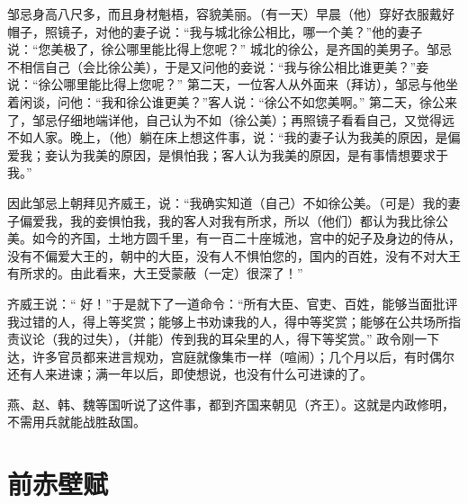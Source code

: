 \documentclass[12pt,UTF-8,openany,a4]{ctexbook}
\begin{document}
\begin{large}\yiwen
    
    邹忌身高八尺多，而且身材魁梧，容貌美丽。（有一天）早晨（他）穿好衣服戴好 帽子，照镜子，对他的妻子说：“我与城北徐公相比，哪一个美？”他的妻子说：“您美极了，徐公哪里能比得上您呢？” 城北的徐公，是齐国的美男子。邹忌不相信自己（会比徐公美），于是又问他的妾说：“我与徐公相比谁更美？”妾说：“徐公哪里能比得上您呢？” 第二天，一位客人从外面来（拜访），邹忌与他坐着闲谈，问他：“我和徐公谁更美？”客人说：“徐公不如您美啊。” 第二天，徐公来了，邹忌仔细地端详他，自己认为不如（徐公美）；再照镜子看看自己，又觉得远不如人家。晚上，（他）躺在床上想这件事，说：“我的妻子认为我美的原因，是偏爱我；妾认为我美的原因，是惧怕我；客人认为我美的原因，是有事情想要求于我。”
    
    因此邹忌上朝拜见齐威王，说：“我确实知道（自己）不如徐公美。（可是）我的妻子偏爱我，我的妾惧怕我，我的客人对我有所求，所以（他们）都认为我比徐公美。如今的齐国，土地方圆千里，有一百二十座城池，宫中的妃子及身边的侍从，没有不偏爱大王的，朝中的大臣，没有人不惧怕您的，国内的百姓，没有不对大王有所求的。由此看来，大王受蒙蔽（一定）很深了！”
    
    齐威王说：“ 好！”于是就下了一道命令：“所有大臣、官吏、百姓，能够当面批评我过错的人，得上等奖赏；能够上书劝谏我的人，得中等奖赏；能够在公共场所指责议论（我的过失），（并能）传到我的耳朵里的人，得下等奖赏。” 政令刚一下达，许多官员都来进言规劝，宫庭就像集市一样（喧闹）；几个月以后，有时偶尔还有人来进谏；满一年以后，即使想说，也没有什么可进谏的了。
    
    燕、赵、韩、魏等国听说了这件事，都到齐国来朝见（齐王）。这就是内政修明，不需用兵就能战胜敌国。
    

\end{large}



\chapter{前赤壁赋}
\end{document}
